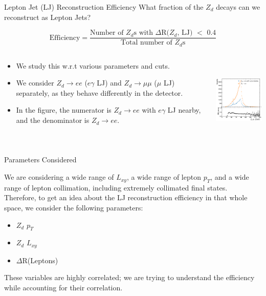 \documentclass{beamer}
\begin{document}
\begin{frame}[t]{Lepton Jet (LJ) Reconstruction Efficiency}
What fraction of the $Z_d$ decays can we reconstruct as Lepton Jets?
\begin{tcolorbox}[colback=uvaorange!5!white,colframe=uvaorange]
\begin{equation*}
    \text{Efficiency} = \frac{\text{Number of $Z_d$s with $\Delta$R($Z_d$, LJ) $<$ 0.4}}{\text{Total number of $Z_d$s}}
\end{equation*}

\end{tcolorbox}
\begin{columns}
\begin{column}{.6\textwidth}
\begin{itemize} 
    \item We study this w.r.t various parameters and cuts.
    \vspace{1pt}
    
    \item We consider $Z_d \rightarrow ee$ ($e\gamma$ LJ) and $Z_d \rightarrow \mu\mu$ ($\mu$ LJ) separately, as they behave differently in the detector.
    \vspace{1pt}
     \item In the figure, the numerator is $Z_d \rightarrow  ee$ with $e\gamma$ LJ nearby, and the denominator is  $Z_d \rightarrow  ee$.
   
\end{itemize}
\end{column}
\begin{column}{.4\textwidth}
\includegraphics[width = 4cm, height =  4cm]{zd_pt_0.25.png}

\end{column}
\end{columns}
\end{frame}
\begin{frame}{Parameters Considered}

We are considering a wide range of $L_{xy}$, a wide range of lepton $p_T$, and a wide range of lepton collimation, including extremely collimated final states.\\
\vspace{12pt}
Therefore, to get an idea about the LJ reconstruction efficiency in that whole space, we consider the following parameters:
\begin{itemize}
    \item $Z_d$ $p_T$
    \item $Z_d$ $L_{xy}$
    \item $\Delta$R(Leptons)
\end{itemize}
\vspace{12pt}
These variables are highly correlated; we are trying to understand the efficiency while accounting for their correlation.

\end{frame}
\end{document}
